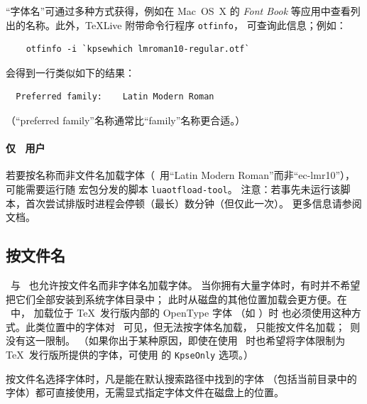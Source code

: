 \documentclass[a4paper]{l3doc}
\begin{document}
“字体名”可通过多种方式获得，例如在 Mac~OS~X 的 \emph{Font Book}
等应用中查看列出的名称。此外，\TeX{}Live 附带命令行程序 \texttt{otfinfo}，
可查询此信息；例如：
\begin{Verbatim}
    otfinfo -i `kpsewhich lmroman10-regular.otf`
\end{Verbatim}
会得到一行类似如下的结果：
\begin{Verbatim}
  Preferred family:    Latin Modern Roman
\end{Verbatim}
（“preferred family”名称通常比“family”名称更合适。）

\paragraph{仅 \LuaTeX\ 用户}
若要按名称而非文件名加载字体（\eg\ 用“Latin Modern Roman”而非“ec-lmr10”），
可能需要运行随  宏包分发的脚本 \texttt{luaotfload-tool}。
注意：若事先未运行该脚本，首次尝试排版时进程会停顿（最长）数分钟（但仅此一次）。
更多信息请参阅  文档。


\subsection{按文件名}
\label{sec:by-file-name}

\XeTeX\ 与 \LuaTeX\ 也允许按文件名而非字体名加载字体。
当你拥有大量字体时，有时并不希望把它们全部安装到系统字体目录中；
此时从磁盘的其他位置加载会更方便。在 \XeTeX\ 中，
加载位于 \TeX\ 发行版内部的 OpenType 字体
（如 ）时
也必须使用这种方式。此类位置中的字体对 \XeTeX\ 可见，但无法按字体名加载，
只能按文件名加载；\LuaTeX\ 则没有这一限制。
（如果你出于某种原因，即使在使用 \LuaTeX\ 时也希望将字体限制为
\TeX\ 发行版所提供的字体，可使用  的
\texttt{KpseOnly} 选项。）

按文件名选择字体时，凡是能在默认搜索路径中找到的字体
（包括当前目录中的字体）都可直接使用，无需显式指定字体文件在磁盘上的位置。
\end{document}
